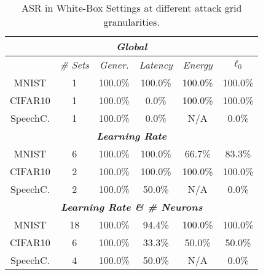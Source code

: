 \begin{table}[!htpb]
\centering
\footnotesize
\caption{ASR in White-Box Settings at different attack grid granularities.}
\begin{tabular}{c|c|c|c|c|c}  \toprule
\multicolumn{6}{c}{\textit{\textbf{Global}}} \\ \midrule
 & \textit{\# Sets} &\textit{Gener.} & \textit{Latency} & \textit{Energy} & \textit{$\ell_0$} \\ \midrule
MNIST & 1 & 100.0\% & 100.0\% & 100.0\% & 100.0\% \\
CIFAR10 & 1 &100.0\% & 0.0\% & 100.0\% & 100.0\% \\
SpeechC. & 1 & 100.0\% & 0.0\% & N/A & 0.0\% \\ \midrule
\multicolumn{6}{c}{\textit{\textbf{Learning Rate}}} \\ \midrule
MNIST & 6 &  100.0\% & 100.0\% & 66.7\% & 83.3\% \\
CIFAR10 & 2 & 100.0\% & 100.0\% & 100.0\% & 100.0\% \\
SpeechC. & 2 & 100.0\% & 50.0\% & N/A & 0.0\% \\\midrule
\multicolumn{6}{c}{\textit{\textbf{Learning Rate \& \# Neurons}}} \\ \midrule
MNIST & 18 & 100.0\% & 94.4\% & 100.0\% & 100.0\% \\
CIFAR10 & 6 & 100.0\% & 33.3\% & 50.0\% & 50.0\% \\
SpeechC. & 4 & 100.0\% & 50.0\% & N/A & 0.0\% \\ \bottomrule
\end{tabular}
\label{tab.asr-wb}
\end{table}


